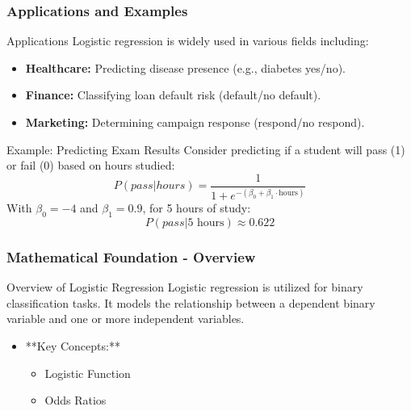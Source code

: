 \documentclass[aspectratio=169]{beamer}
\begin{document}
\begin{frame}[fragile]
    \frametitle{Applications and Examples}
    \begin{block}{Applications}
        Logistic regression is widely used in various fields including:
        \begin{itemize}
            \item \textbf{Healthcare:} Predicting disease presence (e.g., diabetes yes/no).
            \item \textbf{Finance:} Classifying loan default risk (default/no default).
            \item \textbf{Marketing:} Determining campaign response (respond/no respond).
        \end{itemize}
    \end{block}

    \begin{block}{Example: Predicting Exam Results}
        Consider predicting if a student will pass (1) or fail (0) based on hours studied:
        \begin{equation}
        P(pass | hours) = \frac{1}{1 + e^{-(\beta_0 + \beta_1 \cdot \text{hours})}}
        \end{equation}
        With $\beta_0 = -4$ and $\beta_1 = 0.9$, for 5 hours of study:
        \begin{equation}
        P(pass | 5 \text{ hours}) \approx 0.622
        \end{equation}
    \end{block}
\end{frame}

\begin{frame}[fragile]
    \frametitle{Mathematical Foundation - Overview}
    \begin{block}{Overview of Logistic Regression}
        Logistic regression is utilized for binary classification tasks. It models the relationship between a dependent binary variable and one or more independent variables.
    \end{block}
    \begin{itemize}
        \item **Key Concepts:**
        \begin{itemize}
            \item Logistic Function
            \item Odds Ratios
        \end{itemize}
    \end{itemize}
\end{frame}
\end{document}
